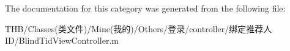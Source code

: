 The documentation for this category was generated from the following file\+:\begin{DoxyCompactItemize}
\item 
T\+H\+B/\+Classes(类文件)/\+Mine(我的)/\+Others/登录/controller/绑定推荐人\+I\+D/Blind\+Tid\+View\+Controller.\+m\end{DoxyCompactItemize}

